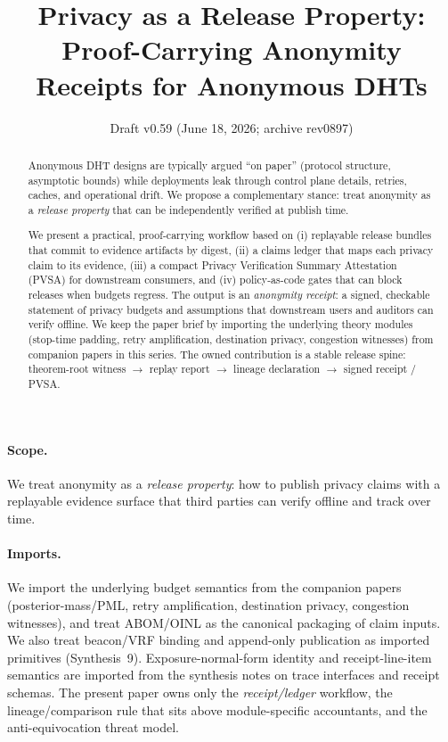 \documentclass[11pt]{article}
\title{Privacy as a Release Property:\\
Proof-Carrying Anonymity Receipts for Anonymous DHTs}
\author{}
\date{Draft v0.59 (June 18, 2026; archive rev0897)}
\begin{document}
\maketitle

\begin{abstract}
Anonymous DHT designs are typically argued ``on paper'' (protocol structure, asymptotic bounds) while deployments leak through control plane details, retries, caches, and operational drift.
We propose a complementary stance: treat anonymity as a \emph{release property} that can be independently verified at publish time.

We present a practical, proof-carrying workflow based on (i) replayable release bundles that commit to evidence artifacts by digest, (ii) a claims ledger that maps each privacy claim to its evidence, (iii) a compact Privacy Verification Summary Attestation (PVSA) for downstream consumers, and (iv) policy-as-code gates that can block releases when budgets regress.
The output is an \emph{anonymity receipt}: a signed, checkable statement of privacy budgets and assumptions that downstream users and auditors can verify offline.
We keep the paper brief by importing the underlying theory modules (stop-time padding, retry amplification, destination privacy, congestion witnesses) from companion papers in this series.
The owned contribution is a stable release spine: theorem-root witness $\rightarrow$ replay report $\rightarrow$ lineage declaration $\rightarrow$ signed receipt / PVSA.
\end{abstract}

\paragraph{Scope.}
We treat anonymity as a \emph{release property}: how to publish privacy claims with a replayable evidence surface that third parties can verify offline and track over time.

\paragraph{Imports.}
We import the underlying budget semantics from the companion papers (posterior-mass/PML, retry amplification, destination privacy, congestion witnesses), and treat ABOM/OINL as the canonical packaging of claim inputs.\cite{series:oddsinflation,series:abomoinl}
We also treat beacon/VRF binding and append-only publication as imported primitives (Synthesis~9).\cite{series:transparencyprimitives}
Exposure-normal-form identity and receipt-line-item semantics are imported from the synthesis notes on trace interfaces and receipt schemas.\cite{series:traceifaces,series:receiptitems}
The present paper owns only the \emph{receipt/ledger} workflow, the lineage/comparison rule that sits above module-specific accountants, and the anti-equivocation threat model.
\end{document}
